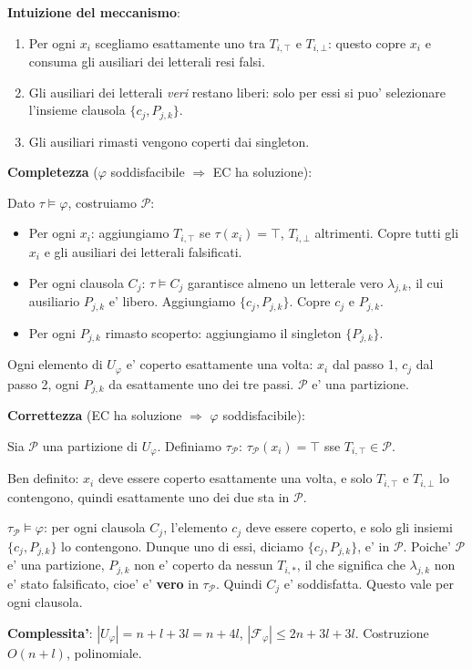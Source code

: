 {  \textbf{Intuizione del meccanismo}:
  \begin{enumerate}
    \item Per ogni $x_i$ scegliamo esattamente uno tra $T_{i,\top}$ e $T_{i,\bot}$: questo copre $x_i$ e consuma gli ausiliari dei letterali resi falsi.
    \item Gli ausiliari dei letterali \textit{veri} restano liberi: solo per essi si puo' selezionare l'insieme clausola $\{c_j, P_{j,k}\}$.
    \item Gli ausiliari rimasti vengono coperti dai singleton.
  \end{enumerate}

  \textbf{Completezza} ($\varphi$ soddisfacibile $\Rightarrow$ EC ha soluzione):

  Dato $\tau \models \varphi$, costruiamo $\mathcal{P}$:
  \begin{itemize}
    \item Per ogni $x_i$: aggiungiamo $T_{i,\top}$ se $\tau(x_i) = \top$, $T_{i,\bot}$ altrimenti. Copre tutti gli $x_i$ e gli ausiliari dei letterali falsificati.
    \item Per ogni clausola $C_j$: $\tau \models C_j$ garantisce almeno un letterale vero $\lambda_{j,k}$, il cui ausiliario $P_{j,k}$ e' libero. Aggiungiamo $\{c_j, P_{j,k}\}$. Copre $c_j$ e $P_{j,k}$.
    \item Per ogni $P_{j,k}$ rimasto scoperto: aggiungiamo il singleton $\{P_{j,k}\}$.
  \end{itemize}
  Ogni elemento di $U_\varphi$ e' coperto esattamente una volta: $x_i$ dal passo 1, $c_j$ dal passo 2, ogni $P_{j,k}$ da esattamente uno dei tre passi. $\mathcal{P}$ e' una partizione.

  \textbf{Correttezza} (EC ha soluzione $\Rightarrow$ $\varphi$ soddisfacibile):

  Sia $\mathcal{P}$ una partizione di $U_\varphi$. Definiamo $\tau_\mathcal{P}$: $\tau_\mathcal{P}(x_i) = \top$ sse $T_{i,\top} \in \mathcal{P}$.

  Ben definito: $x_i$ deve essere coperto esattamente una volta, e solo $T_{i,\top}$ e $T_{i,\bot}$ lo contengono, quindi esattamente uno dei due sta in $\mathcal{P}$.

  $\tau_\mathcal{P} \models \varphi$: per ogni clausola $C_j$, l'elemento $c_j$ deve essere coperto, e solo gli insiemi $\{c_j, P_{j,k}\}$ lo contengono. Dunque uno di essi, diciamo $\{c_j, P_{j,k}\}$, e' in $\mathcal{P}$. Poiche' $\mathcal{P}$ e' una partizione, $P_{j,k}$ non e' coperto da nessun $T_{i,*}$, il che significa che $\lambda_{j,k}$ non e' stato falsificato, cioe' e' \textbf{vero} in $\tau_\mathcal{P}$. Quindi $C_j$ e' soddisfatta. Questo vale per ogni clausola.

  \textbf{Complessita'}: $|U_\varphi| = n + l + 3l = n + 4l$, $|\mathcal{F}_\varphi| \leq 2n + 3l + 3l$. Costruzione $O(n + l)$, polinomiale.
}

